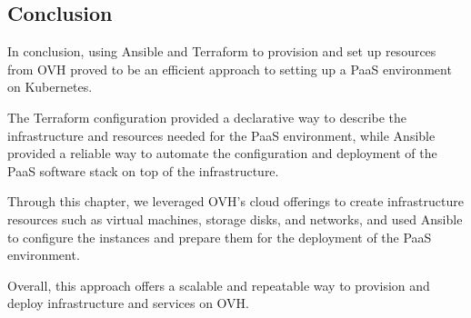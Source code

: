 \subsection*{Conclusion}

In conclusion, using Ansible and Terraform to provision and set up resources from OVH proved to be an efficient approach to setting up a PaaS environment on Kubernetes.  

The Terraform configuration provided a declarative way to describe the infrastructure and resources needed for the PaaS environment, while Ansible provided a reliable way to automate the configuration and deployment of the PaaS software stack on top of the infrastructure. 

Through this chapter, we leveraged OVH's cloud offerings to create infrastructure resources such as virtual machines, storage disks, and networks, and used Ansible to configure the instances and prepare them for the deployment of the PaaS environment. 

Overall, this approach offers a scalable and repeatable way to provision and deploy infrastructure and services on OVH.